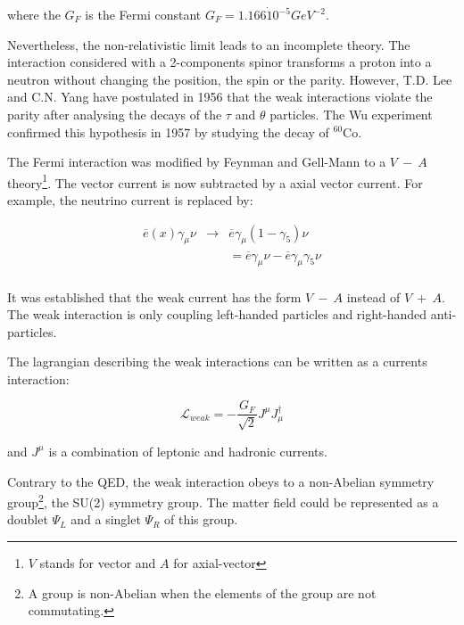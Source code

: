     where the $G_F$ is the Fermi constant $G_F = 1.166 \dot 10^{-5} GeV^{-2}$. 
    
    Nevertheless, the non-relativistic limit leads to an incomplete theory.
    The interaction considered with a 2-components spinor transforms a proton into a neutron without changing the position, the spin or the parity.
    However, T.D. Lee and C.N. Yang have postulated in 1956 that the weak interactions violate the parity after analysing the decays of the $\tau$ and $\theta$ particles\cite{1956PhRv..104..254L}.
    The Wu experiment \cite{1957PhRv..105.1413W} confirmed this hypothesis in 1957 by studying the decay of $^{60}$Co.

    The Fermi interaction was modified by Feynman and Gell-Mann\cite{PhysRev.109.193} to a $V \ - \ A$ theory\footnote{$V$ stands for vector and $A$ for axial-vector}.
    The vector current is now subtracted by a axial vector current. For example, the neutrino current is replaced by:

    \begin{equation}
        \begin{array}{rcc}
        \overline{e}(x) \gamma_{\mu} \nu & \rightarrow & \overline{e}\gamma_{\mu}(1 - \gamma_5 ) \nu \\
            & & = \overline{e} \gamma_{\mu} \nu - \overline{e}\gamma_{\mu} \gamma_5 \nu \\
        \end{array}
    \end{equation}

    It was established that the weak current has the form $V \ - \ A$ instead of $V \ + \ A$.
    The weak interaction is only coupling left-handed particles and right-handed anti-particles.
    
    The lagrangian describing the weak interactions can be written as a currents interaction:

    \begin{equation}
      \mathcal{L}_{weak} = - \frac{G_F}{\sqrt{2}} J^{\mu}J_{\mu}^{\dagger}
    \end{equation}
    
     and $J^{\mu}$ is a combination of leptonic and hadronic currents.

    Contrary to the QED, the weak interaction obeys to a non-Abelian symmetry group\footnote{A group is non-Abelian when the elements of the group are not commutating.}, the SU(2) symmetry group.
    The matter field could be represented as a doublet $\Psi_L$ and a singlet $\Psi_R$ of this group.

